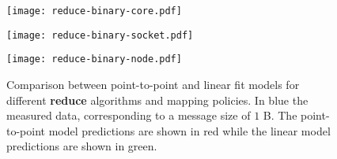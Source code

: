 \documentclass[../main.tex]{subfiles}
\begin{document}
\begin{figure}[p]
\begin{adjustwidth}{-1.5cm}{-1.5cm}
    \begin{minipage}{0.40\textwidth}
        \centering
        \texttt{[image: reduce-binary-core.pdf]}
    \end{minipage}\hfill
    \begin{minipage}{0.40\textwidth}
        \centering
        \texttt{[image: reduce-binary-socket.pdf]}
    \end{minipage}\hfill
    \begin{minipage}{0.40\textwidth}
        \centering
        \texttt{[image: reduce-binary-node.pdf]}
    \end{minipage}
    \end{adjustwidth}
    
    \caption{Comparison between point-to-point and linear fit models for different \textbf{reduce} algorithms and mapping policies. In blue the measured data, corresponding to a message size of $1$ B. The point-to-point model predictions are shown in red while the linear model predictions are shown in green.}
    \label{fig:bcast-results}
\end{figure}
\end{document}
